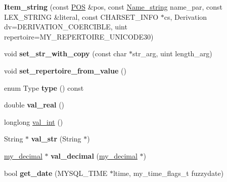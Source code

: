 \begin{DoxyCompactItemize}
\item 
\mbox{\label{classItem__string_a8991f3201af3ec081a7a43dcc2829b8b}} 
{\bfseries Item\+\_\+string} (const \mbox{\hyperlink{structYYLTYPE}{P\+OS}} \&pos, const \mbox{\hyperlink{className__string}{Name\+\_\+string}} name\+\_\+par, const L\+E\+X\+\_\+\+S\+T\+R\+I\+NG \&literal, const C\+H\+A\+R\+S\+E\+T\+\_\+\+I\+N\+FO $\ast$cs, Derivation dv=D\+E\+R\+I\+V\+A\+T\+I\+O\+N\+\_\+\+C\+O\+E\+R\+C\+I\+B\+LE, uint repertoire=M\+Y\+\_\+\+R\+E\+P\+E\+R\+T\+O\+I\+R\+E\+\_\+\+U\+N\+I\+C\+O\+D\+E30)
\item 
\mbox{\label{classItem__string_aa5f770cd19040c27f2a524e97c6116ca}} 
void {\bfseries set\+\_\+str\+\_\+with\+\_\+copy} (const char $\ast$str\+\_\+arg, uint length\+\_\+arg)
\item 
\mbox{\label{classItem__string_ab46866fec9f2e9996279c9ecfa1d86af}} 
void {\bfseries set\+\_\+repertoire\+\_\+from\+\_\+value} ()
\item 
\mbox{\label{classItem__string_acb40f3fc60ee1941259c28e1d9789d06}} 
enum Type {\bfseries type} () const
\item 
\mbox{\label{classItem__string_a4961a054a19d4f5629fafcb324d1225a}} 
double {\bfseries val\+\_\+real} ()
\item 
longlong \mbox{\hyperlink{classItem__string_a4226f4dfd6a0c9eb1b97c33da0b3db78}{val\+\_\+int}} ()
\item 
\mbox{\label{classItem__string_a1802ccd4f10b0bba148ecac31c4f18dc}} 
String $\ast$ {\bfseries val\+\_\+str} (String $\ast$)
\item 
\mbox{\label{classItem__string_ae47af816399ee4ab8e9a9fbb95a98d1f}} 
\mbox{\hyperlink{classmy__decimal}{my\+\_\+decimal}} $\ast$ {\bfseries val\+\_\+decimal} (\mbox{\hyperlink{classmy__decimal}{my\+\_\+decimal}} $\ast$)
\item 
\mbox{\label{classItem__string_a8c76141b899f3e8d54a20063f6779e9b}} 
bool {\bfseries get\+\_\+date} (M\+Y\+S\+Q\+L\+\_\+\+T\+I\+ME $\ast$ltime, my\+\_\+time\+\_\+flags\+\_\+t fuzzydate)
\item 

\end{DoxyCompactItemize}
